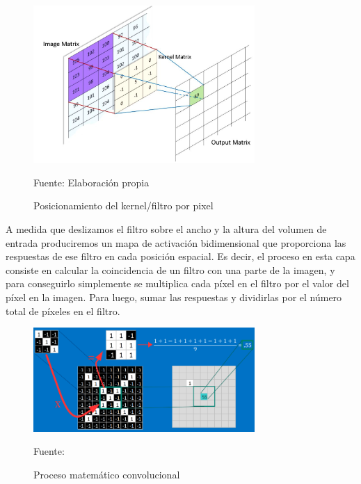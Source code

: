 		\begin{figure}[H]
		\begin{center}
		\includegraphics[width=0.75\textwidth]{images/marcoteorico/Convolution_calculation1}
		\end{center}
		\begin{center}
		\caption{\small{Posicionamiento del kernel/filtro por pixel}}
		{\small{Fuente: Elaboración propia}}
		\end{center}
		\vspace{-1.9em}
		\end{figure}

		A medida que deslizamos el filtro sobre el ancho y la altura del volumen de entrada produciremos un mapa de activación bidimensional que proporciona las respuestas de ese filtro en cada posición espacial. Es decir, el proceso en esta capa consiste en calcular la coincidencia de un filtro con una parte de la imagen, y para conseguirlo simplemente se multiplica cada píxel en el filtro por el valor del píxel en la imagen. Para luego, sumar las respuestas y dividirlas por el número total de píxeles en el filtro.

		\begin{figure}[H]
		\begin{center}
		\includegraphics[width=0.75\textwidth]{images/marcoteorico/conv_filt1}
		\end{center}
		\begin{center}
		\caption{\small{Proceso matemático convolucional}}
		{\small{Fuente:\cite{Rohrer}}}
		\end{center}
		\vspace{-1.5em}
		\end{figure}

